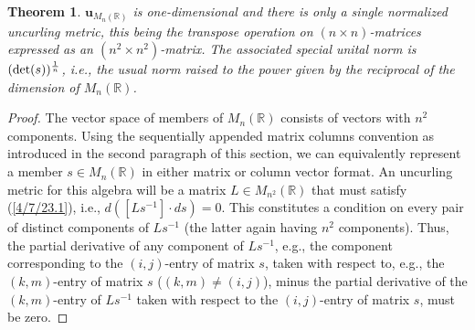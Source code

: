 \documentclass{amsart}
\numberwithin{equation}{section}
\newtheorem{theorem}{Theorem}
\theoremstyle{definition}
\numberwithin{theorem}{section}
\begin{document}
   
 \begin{theorem} \label{4/8/22.1} $\mathbf{u}_{M_n(\mathbb{R})}$ is one-dimensional and there is only a single normalized uncurling metric, this being the  transpose operation on $(n\times n)$-matrices expressed as an $(n^2\times n^2)$-matrix. The associated special unital norm is $({\rm det}(s))^{\frac{1}{n}}$, i.e., the usual norm raised to the power given by the reciprocal of the dimension of $M_n(\mathbb{R})$. \end{theorem}
 \begin{proof} The vector space of members of $ M_n(\mathbb{R})$ consists of  vectors with $n^2$ components.   Using the sequentially appended matrix columns convention as introduced in the second paragraph of this section, we can equivalently represent a member $s\in M_n(\mathbb{R})$ in either matrix or column vector format.   An uncurling metric for this algebra will be a matrix $L\in M_{n^2}(\mathbb{R})$ that must satisfy (\ref{4/7/23.1}), i.e., $d\left([Ls^{-1}]\cdot ds\right)=0$. This constitutes a condition on every pair of distinct components of $Ls^{-1}$ (the latter again having $n^2$ components).  Thus,  the partial derivative of any component of $Ls^{-1}$, e.g., the component corresponding to the $(i,j)$-entry of matrix $s$, taken with respect to, e.g., the $(k,m)$-entry of matrix $s$ ($(k,m)\ne (i,j)$),  minus  the partial derivative of the $(k,m)$-entry of $Ls^{-1}$  taken with respect to the $(i,j)$-entry of matrix $s$, must be zero.
 

\end{proof}
\end{document}
